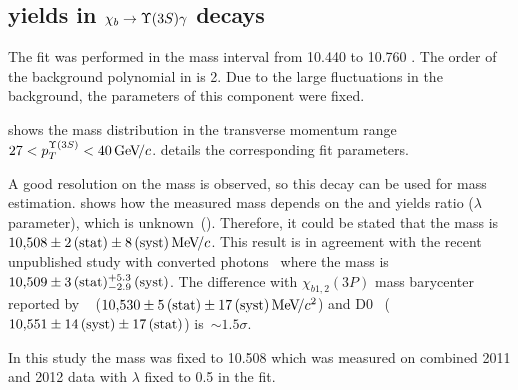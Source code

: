 \subsection{\texorpdfstring{\chib}{xb} yields in
    \texorpdfstring{$\chib \to \Y3S \gamma$}{xb --> Y(3S) gamma} decays}
\label{sec:chib:ups3s:fit}

The fit was performed in the mass interval from  10.440 to 10.760 \gevcc. 
The order of the background polynomial in  is 2.
Due to the large fluctuations in the background, the
parameters of this component were fixed.


 shows the mass distribution in the
transverse momentum range $27<p_T^{\Y3S}<40\gevc$.
 details the corresponding fit parameters.




A good resolution on the \chiboneThreeP mass is observed, so this decay can be
used for \chiboneThreeP mass estimation.  shows how
the measured \chiboneThreeP mass depends on the \chiboneThreeP and \chibtwoThreeP
yields ratio ($\lambda$ parameter), which is unknown~(). 
Therefore, it could be stated that the \chiboneThreeP mass is $10{,}508 \pm 2\mathrm{\,(stat)} \pm 8\mathrm{\,(syst)} {\mathrm{\,Me\kern -0.1em V\!/}c}$.
This result is in agreement with the recent unpublished 
\lhcb study with converted photons~\cite{edwige} where the \chiboneThreeP mass is
$10{,}509 \pm 3\mathrm{\,(stat)}{}^{+5.3}_{-2.9}\mathrm{\,(syst)}$. The difference with
$\chi_{b1,2}(3P)$ mass barycenter reported by \atlas~\cite{Aad:2011ih} ($10{,}530 \pm 5\mathrm{\,(stat)}
\pm 17\mathrm{\,(syst)} {\mathrm{\,Me\kern -0.1em V\!/}c^2}$) and D0~\cite{Abazov:2012gh}  ($10{,}551 \pm 14\mathrm{\,(syst)} \pm 17\mathrm{\,(stat)}$)
is~$\sim{}1.5\sigma$.




In this study the mass was fixed to 10.508 \gevcc which was measured 
on combined 2011 and 2012 data with $\lambda$ fixed to 0.5 in the fit.





